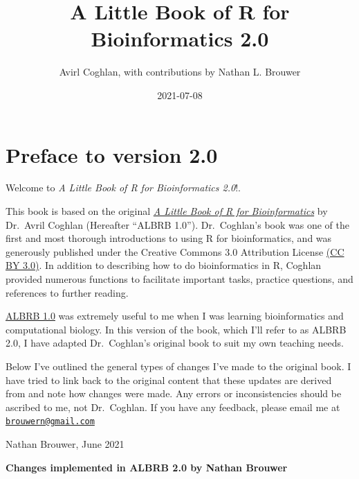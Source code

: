 \documentclass[
]{book}
\title{A Little Book of R for Bioinformatics 2.0}
\author{Avirl Coghlan, with contributions by Nathan L. Brouwer}
\date{2021-07-08}
\begin{document}
\maketitle

{
\setcounter{tocdepth}{1}
\tableofcontents
}
\hypertarget{preface-to-version-2.0}{%
\chapter*{Preface to version 2.0}\label{preface-to-version-2.0}}

Welcome to \emph{A Little Book of R for Bioinformatics 2.0}!.

This book is based on the original \href{https://a-little-book-of-r-for-bioinformatics.readthedocs.io/en/latest/}{\emph{A Little Book of R for Bioinformatics}} by Dr.~Avril Coghlan (Hereafter ``ALBRB 1.0''). Dr.~Coghlan's book was one of the first and most thorough introductions to using R for bioinformatics, and was generously published under the Creative Commons 3.0 Attribution License \href{https://creativecommons.org/licenses/by/3.0/}{(CC BY 3.0)}. In addition to describing how to do bioinformatics in R, Coghlan provided numerous functions to facilitate important tasks, practice questions, and references to further reading.

\href{https://a-little-book-of-r-for-bioinformatics.readthedocs.io/en/latest/}{ALBRB 1.0} was extremely useful to me when I was learning bioinformatics and computational biology. In this version of the book, which I'll refer to as ALBRB 2.0, I have adapted Dr.~Coghlan's original book to suit my own teaching needs.

Below I've outlined the general types of changes I've made to the original book. I have tried to link back to the original content that these updates are derived from and note how changes were made. Any errors or inconsistencies should be ascribed to me, not Dr.~Coghlan. If you have any feedback, please email me at \href{mailto:brouwern@gmail.com}{\nolinkurl{brouwern@gmail.com}}

Nathan Brouwer, June 2021

\textbf{Changes implemented in ALBRB 2.0 by Nathan Brouwer}
\end{document}

